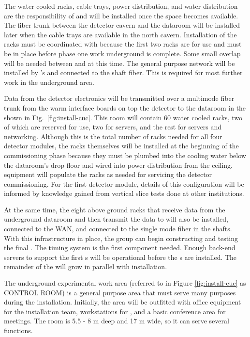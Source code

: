 The water cooled racks, cable trays, power distribution, and water distribution are the responsibility of  and will be installed once the space becomes available. The  fiber trunk between the detector cavern and the  dataroom will be installed later when the cable trays are available in the north cavern. Installation of the racks must be coordinated with  because the first two racks are for  use and must be in place before phase one work underground is complete. Some small overlap will be needed between  and  at this time. The general purpose network will be installed by 's  and connected to the shaft fiber. This is required for most further work in the underground area.

Data from the detector electronics will be transmitted over a multimode fiber trunk from the warm interface boards on top the detector to the  dataroom in the  shown in Fig.~\ref{fig:install-cuc}.  This room will contain 60 water cooled racks, two of which are reserved for  use, two for  servers, and the rest for  servers and networking. Although this is the total number of racks needed for all four detector modules, the racks themselves will be installed at the beginning of the  commissioning phase because they must be plumbed into the cooling water below the dataroom's drop floor and wired into power distribution from the ceiling.   equipment will populate the racks as needed for servicing the detector commissioning.  For the first detector module, details of this configuration will be informed by knowledge gained from  vertical slice tests done at other institutions.  

At the same time, the eight above ground  racks that receive data from the underground dataroom and then transmit the data to  will also be installed, connected to the WAN, and connected to the single mode fiber in the shafts. With this infrastructure in place, the  group can begin constructing and testing the final  .  The timing system is the first  component needed.  Enough  back-end servers to support the first s will be operational before the s are installed.  The remainder of the  will grow in parallel with  installation.

The underground experimental work area (referred to in Figure \ref{fig:install-cuc} as CONTROL ROOM) is a general purpose area that must serve many purposes during the  installation. 
Initially, the area will be outfitted with office equipment for the installation team, workstations for , and a basic conference area for meetings.
The room is 5.5 - 8 \si{m} deep and 17 \si{m} wide, so it can serve several functions.

